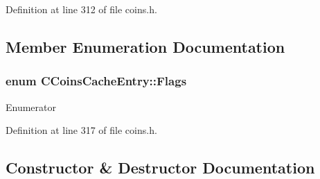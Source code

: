 Definition at line 312 of file coins.\+h.



\subsection{Member Enumeration Documentation}
\hypertarget{struct_c_coins_cache_entry_a1d5ac74da0f6ff5ab056e47ce79753c7}{}
\subsubsection[{Flags}]{\setlength{\rightskip}{0pt plus 5cm}enum {\bf C\+Coins\+Cache\+Entry\+::\+Flags}}\label{struct_c_coins_cache_entry_a1d5ac74da0f6ff5ab056e47ce79753c7}
\begin{Desc}
\item[Enumerator]\par
\begin{description}
\item[{\em 
\hypertarget{struct_c_coins_cache_entry_a1d5ac74da0f6ff5ab056e47ce79753c7ac8cbd1b21d937e8618f9fecdf2c7223e}{}D\+I\+R\+T\+Y\label{struct_c_coins_cache_entry_a1d5ac74da0f6ff5ab056e47ce79753c7ac8cbd1b21d937e8618f9fecdf2c7223e}
}]\item[{\em 
\hypertarget{struct_c_coins_cache_entry_a1d5ac74da0f6ff5ab056e47ce79753c7aae43958b088ff7b6e4f0daaafff00816}{}F\+R\+E\+S\+H\label{struct_c_coins_cache_entry_a1d5ac74da0f6ff5ab056e47ce79753c7aae43958b088ff7b6e4f0daaafff00816}
}]\end{description}
\end{Desc}


Definition at line 317 of file coins.\+h.



\subsection{Constructor \& Destructor Documentation}
\hypertarget{struct_c_coins_cache_entry_ad241b5b23552ba45c0372b71f73d0f25}{}
